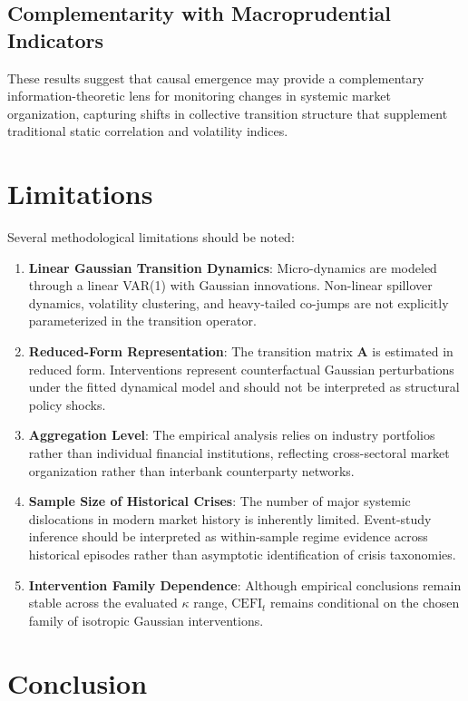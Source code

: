 \documentclass[review,12pt,authoryear]{elsarticle}
\begin{document}
\subsection{Complementarity with Macroprudential Indicators}
These results suggest that causal emergence may provide a complementary information-theoretic lens for monitoring changes in systemic market organization, capturing shifts in collective transition structure that supplement traditional static correlation and volatility indices.

\section{Limitations}
\label{sec:limitations}

Several methodological limitations should be noted:
\begin{enumerate}
    \item \textbf{Linear Gaussian Transition Dynamics}: Micro-dynamics are modeled through a linear VAR(1) with Gaussian innovations. Non-linear spillover dynamics, volatility clustering, and heavy-tailed co-jumps are not explicitly parameterized in the transition operator.
    \item \textbf{Reduced-Form Representation}: The transition matrix $\mathbf{A}$ is estimated in reduced form. Interventions represent counterfactual Gaussian perturbations under the fitted dynamical model and should not be interpreted as structural policy shocks.
    \item \textbf{Aggregation Level}: The empirical analysis relies on industry portfolios rather than individual financial institutions, reflecting cross-sectoral market organization rather than interbank counterparty networks.
    \item \textbf{Sample Size of Historical Crises}: The number of major systemic dislocations in modern market history is inherently limited. Event-study inference should be interpreted as within-sample regime evidence across historical episodes rather than asymptotic identification of crisis taxonomies.
    \item \textbf{Intervention Family Dependence}: Although empirical conclusions remain stable across the evaluated $\kappa$ range, $\mathrm{CEFI}_t$ remains conditional on the chosen family of isotropic Gaussian interventions.
\end{enumerate}

\section{Conclusion}
\label{sec:conclusion}
\end{document}
